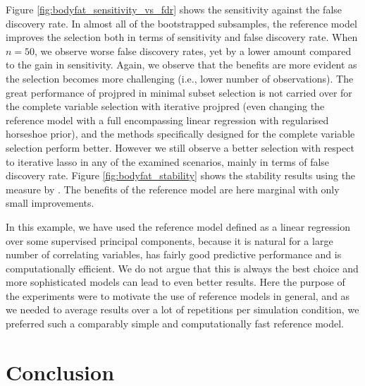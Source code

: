 \documentclass[a4]{article}
\theoremstyle{definition}
\begin{document}
Figure \ref{fig:bodyfat_sensitivity_vs_fdr} shows the sensitivity
against the false discovery rate.  In almost all of the bootstrapped
subsamples, the reference
model improves the selection both in terms of sensitivity and false
discovery rate. When $n=50$, we observe worse false
discovery rates, yet by a lower amount compared to the gain in
sensitivity. Again, we observe that the benefits are more evident as
the selection becomes more challenging (i.e., lower number of
observations).
The great performance of projpred in minimal subset selection is not
carried over for the complete variable selection with iterative
projpred (even changing the reference model with a full encompassing 
linear regression with regularised horseshoe prior), and the methods 
specifically designed for the complete variable selection perform better. 
However we still observe a better selection with respect to iterative lasso
in any of the examined scenarios, mainly in terms of false discovery rate.
Figure \ref{fig:bodyfat_stability} shows the stability
results using the measure by
\cite{paper:stability}. The benefits of the reference model are here
marginal with only small improvements.

In this example, we have used the reference model defined as a linear
regression over some supervised principal components, because it is
natural for a large number of correlating variables, has fairly good
predictive performance and is computationally efficient. We do not
argue that this is always the best choice and more sophisticated
models can lead to even better results. Here the purpose of the
experiments were to motivate the use of reference models in general,
and as we needed to average results over a lot of repetitions per
simulation condition, we preferred such a comparably simple and
computationally fast reference model.

\hypertarget{conclusion}{%
\section{Conclusion}\label{conclusion}}
\end{document}
